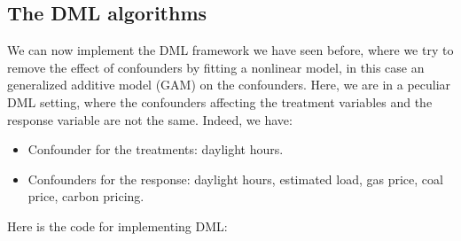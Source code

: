 \documentclass[letterpaper,10pt,english]{jupyterBook}
\begin{document}
\subsection{The DML algorithms}
\label{\detokenize{notebooks/double_machine_learning:the-dml-algorithms}}
\sphinxAtStartPar
We can now implement the DML framework we have seen before, where we try to remove the effect of confounders by fitting a nonlinear model, in this case an generalized additive model (GAM) on the confounders. Here, we are in a peculiar DML setting, where the confounders affecting the treatment variables and the response variable are not the same. Indeed, we have:
\begin{itemize}
\item {} 
\sphinxAtStartPar
Confounder for the treatments: daylight hours.

\item {} 
\sphinxAtStartPar
Confounders for the response: daylight hours, estimated load, gas price, coal price, carbon pricing.

\end{itemize}

\sphinxAtStartPar
Here is the code for implementing DML:
\end{document}
